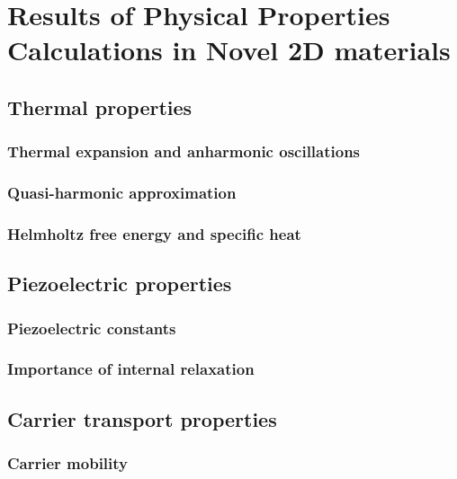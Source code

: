 
\chapter{Results of Physical Properties Calculations in Novel 2D materials \label{chap:4}}

\ifpdf
    \graphicspath{{Chapter4/Figs/Raster/}{Chapter4/Figs/PDF/}{Chapter4/Figs/}}
\else
    \graphicspath{{Chapter4/Figs/Vector/}{Chapter4/Figs/}}
\fi

\section{Thermal properties}
\subsection{Thermal expansion and anharmonic oscillations}
\subsection{Quasi-harmonic approximation}
\subsection{Helmholtz free energy and specific heat}

\section{Piezoelectric properties}
\subsection{Piezoelectric constants}
\subsection{Importance of internal relaxation}

\section{Carrier transport properties}
\subsection{Carrier mobility}
